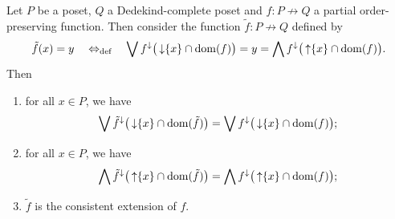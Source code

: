 \begin{proposition} \label{consistentExtensionIsotoneFunctionToDedekindCompletePoset}
Let $P$ be a poset, $Q$ a Dedekind-complete poset and $f: P\not\to Q$ a partial order-preserving function. Then consider the function $\tilde{f}: P\not\to Q$ defined by
\[ \tilde{f}(x) = y \quad\Leftrightarrow_{\text{def}}\quad \bigvee f^\downarrow\big(\operatorname{\downarrow} \{x\} \cap \operatorname{dom}(f)\big) = y = \bigwedge f^\downarrow\big(\operatorname{\uparrow} \{x\} \cap \operatorname{dom}(f)\big). \]
Then
\begin{enumerate}
\item for all $x\in P$, we have
\[ \bigvee \tilde{f}^\downarrow\big(\operatorname{\downarrow} \{x\} \cap \operatorname{dom}(\tilde{f})\big) = \bigvee f^\downarrow\big(\operatorname{\downarrow} \{x\} \cap \operatorname{dom}(f)\big); \]
\item for all $x\in P$, we have
\[ \bigwedge \tilde{f}^\downarrow\big(\operatorname{\uparrow} \{x\} \cap \operatorname{dom}(\tilde{f})\big) = \bigwedge f^\downarrow\big(\operatorname{\uparrow} \{x\} \cap \operatorname{dom}(f)\big); \]
\item $\tilde{f}$ is the consistent extension of $f$.
\end{enumerate}
\end{proposition}
